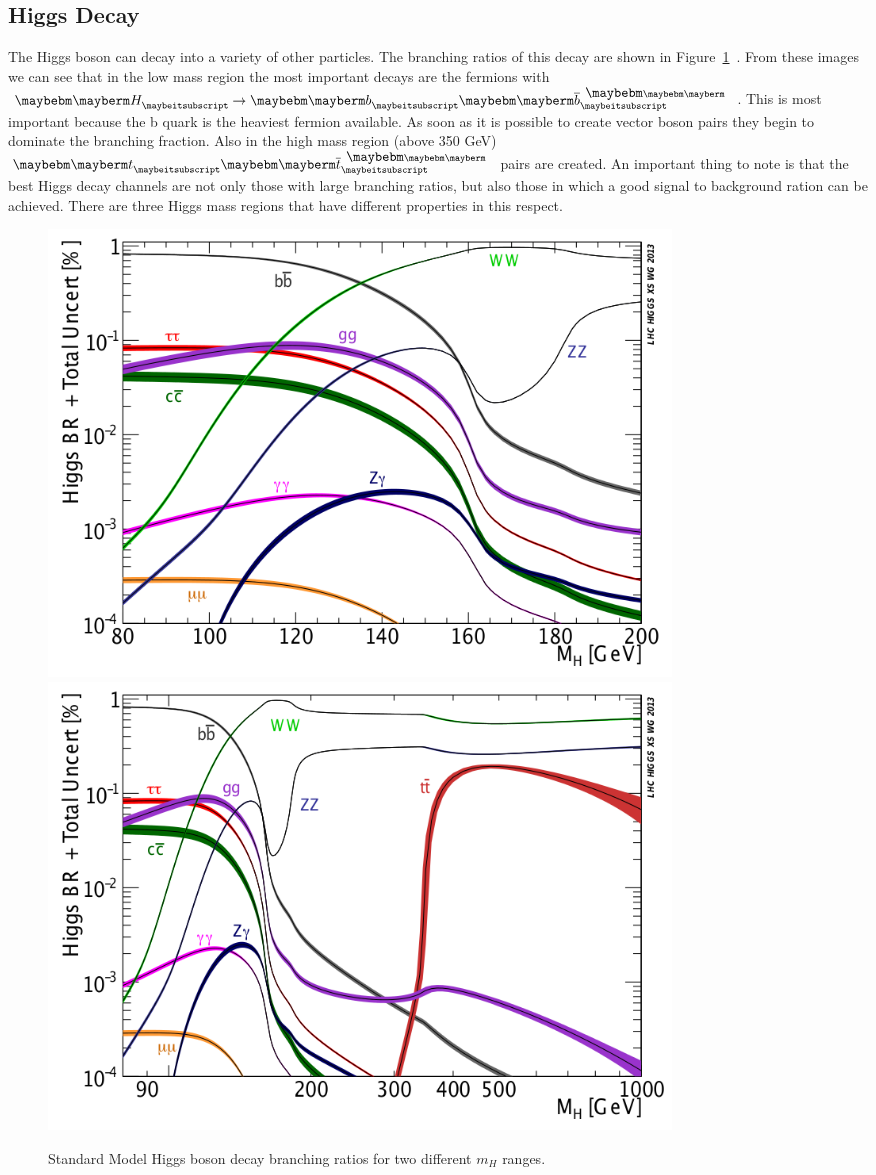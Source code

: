 \subsection{Higgs Decay}

The Higgs boson can decay into a variety of other particles.  The branching ratios of this decay are shown in Figure~\ref{fig:Higgs_decay}~\cite{LHC_Higgs_Gallery}.  From these images we can see that in the low mass region the most important decays are the fermions with $\PH \rightarrow \Pqb\Paqb$.  This is most important because the b quark is the heaviest fermion available.  As soon as it is possible to create vector boson pairs they begin to dominate the branching fraction.  Also in the high mass region (above 350 GeV) $\Pqt\Paqt$ pairs are created.  An important thing to note is that the best Higgs decay channels are not only those with large branching ratios, but also those in which a good signal to background ration can be achieved. There are three Higgs mass regions that have different properties in this respect.


\begin{figure}[htb]
\centering
\includegraphics[width=0.8\textwidth]{StandardModel/Higgs_BR_LM_RECT.png} \includegraphics[width=0.8\textwidth]{StandardModel/Higgs_BR_RECT.png}
\caption{\small Standard Model Higgs boson decay branching ratios for two different $m_H$ ranges. ~\cite{LHC_Higgs_Gallery}
         }
\label{fig:Higgs_decay}
\end{figure}


